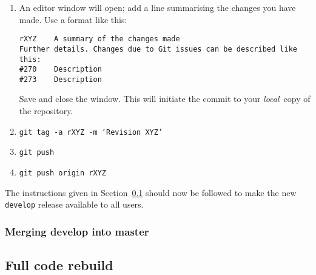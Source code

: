 \begin{enumerate}
\item An editor window will open; add a line summarising the changes you have made.  Use a format like this:
\begin{verbatim}
rXYZ    A summary of the changes made
Further details. Changes due to Git issues can be described like this:
#270    Description
#273    Description
\end{verbatim}
Save and close the window. This will initiate the commit to your \textit{local}\ copy of the repository.

\item \texttt{git tag -a rXYZ -m `Revision XYZ'}

\item \texttt{git push}

\item \texttt{git push origin rXYZ}

\end{enumerate}

The instructions given in Section~\ref{sec:fullrebuild} should now be followed to make the new \texttt{develop} release available to all users.

\subsubsection{Merging develop into master}


\subsection{Full code rebuild}
\label{sec:fullrebuild}

